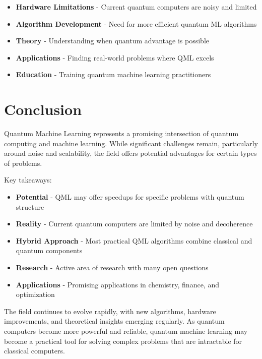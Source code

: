 \documentclass[11pt]{article}
\begin{document}
\begin{itemize}
    \item \textbf{Hardware Limitations} - Current quantum computers are noisy and limited
    \item \textbf{Algorithm Development} - Need for more efficient quantum ML algorithms
    \item \textbf{Theory} - Understanding when quantum advantage is possible
    \item \textbf{Applications} - Finding real-world problems where QML excels
    \item \textbf{Education} - Training quantum machine learning practitioners
\end{itemize}

\section{Conclusion}

Quantum Machine Learning represents a promising intersection of quantum computing and machine learning. While significant challenges remain, particularly around noise and scalability, the field offers potential advantages for certain types of problems.

Key takeaways:
\begin{itemize}
    \item \textbf{Potential} - QML may offer speedups for specific problems with quantum structure
    \item \textbf{Reality} - Current quantum computers are limited by noise and decoherence
    \item \textbf{Hybrid Approach} - Most practical QML algorithms combine classical and quantum components
    \item \textbf{Research} - Active area of research with many open questions
    \item \textbf{Applications} - Promising applications in chemistry, finance, and optimization
\end{itemize}

The field continues to evolve rapidly, with new algorithms, hardware improvements, and theoretical insights emerging regularly. As quantum computers become more powerful and reliable, quantum machine learning may become a practical tool for solving complex problems that are intractable for classical computers.
\end{document}
